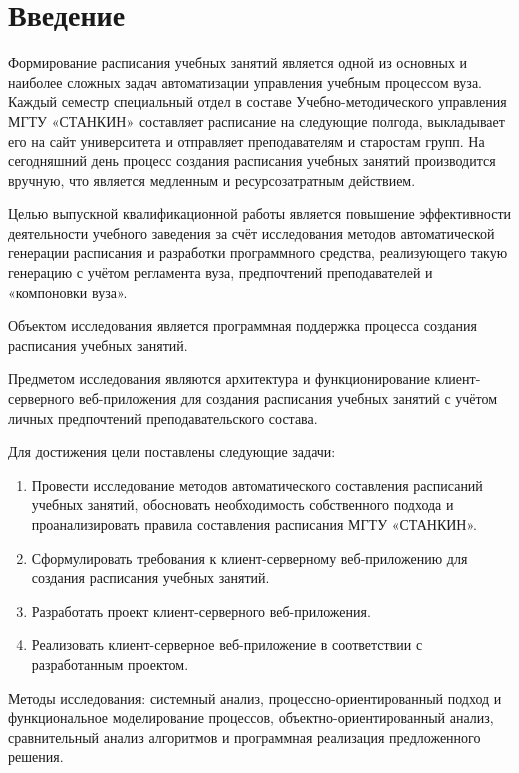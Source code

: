 {}

\section*{Введение}

Формирование расписания учебных занятий является одной из основных и наиболее сложных задач автоматизации управления учебным процессом вуза. Каждый семестр специальный отдел в составе Учебно-методического управления МГТУ «СТАНКИН» \cite{stankin:schedule} составляет расписание на следующие полгода, выкладывает его на сайт университета и отправляет преподавателям и старостам групп. На сегодняшний день процесс создания расписания учебных занятий производится вручную, что является медленным и ресурсозатратным действием.

Целью выпускной квалификационной работы является повышение эффективности деятельности учебного заведения за счёт исследования методов автоматической генерации расписания и разработки программного средства, реализующего такую генерацию с учётом регламента вуза, предпочтений преподавателей и «компоновки вуза».

Объектом исследования является программная поддержка процесса создания расписания учебных занятий.

Предметом исследования являются архитектура и функционирование клиент-серверного веб-приложения для создания расписания учебных занятий с учётом личных предпочтений преподавательского состава.

Для достижения цели поставлены следующие задачи:
\begin{enumerate}
	\item Провести исследование методов автоматического составления расписаний учебных занятий, обосновать необходимость собственного подхода и проанализировать правила составления расписания МГТУ «СТАНКИН».
	\item Сформулировать требования к клиент-серверному веб-приложению для создания расписания учебных занятий.
	\item Разработать проект клиент-серверного веб-приложения.
	\item Реализовать клиент-серверное веб-приложение в соответствии с разработанным проектом.
\end{enumerate}

Методы исследования: системный анализ, процессно-ориентированный подход и функциональное моделирование процессов, объектно-ориентированный анализ, сравнительный анализ алгоритмов и программная реализация предложенного решения.


